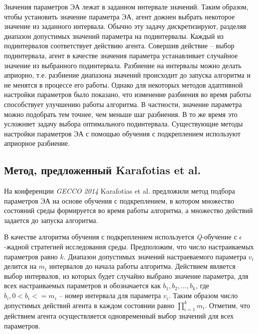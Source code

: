 Значения параметров ЭА лежат в заданном интервале значений. Таким образом, чтобы установить значение параметра ЭА, агент дожнен выбрать некоторое значение из заданного интервала. Обычно эту задачу дискретизируют, разделяя диапазон допустимых значений параметра на подинтервалы. Каждый из подинтервалов соответствует действию агента. Совершив действие -- выбор подинтервала, агент в качестве значения параметра устанавливает случайное значение из выбранного подинтервала. Разбиение на интервалы можно делать априорно, т.е. разбиение диапазона значений происходит до запуска алгоритма и не менятся в процессе его работы. Однако для некоторых методов адаптивной настройки параметров было показано, что изменение разбиения во время работы способствует улучшению работы алгоритма. В частности, значение параметра можно подобрать тем точнее, чем меньше шаг разбиения. В то же время это усложняет задачу выбора оптимального подинтервала. Существующие методы настройки параметров ЭА с помощью обучения с подкреплением используют априорное разбиение.

\subsection{Метод, предложенный Karafotias et al.}
\label{karafotias}

На конференции \textit{GECCO 2014} Karafotias et al. предложили метод подбора параметров ЭА на основе обучения с подкреплением, в котором множество состояний среды формируется во время работы алгоритма, а множество действий задается до запуска алгоритма.

В качестве алгоритма обучения с подкреплением используется \textit{Q}-обучение с $\epsilon$-жадной стратегией исследования среды.
Предположим, что число настраиваемых параметров равно $k$. Диапазон допустимых значений настраеваемого параметра $v_i$ делится на $m_i$ интервалов до начала работы алгоритма. Действием является выбор интервалов, из которых будет случайно выбрано значение параметра, для всех настраиваемых параметров и обозначается как $b_1, b_2, \ldots, b_k$, где $b_i, 0 < b_i <= m_i$ -- номер интервала для параметра $v_i$. Таким образом число допустимых действий агента в каждом состоянии равно $\prod\limits_{i = 1}^k{m_i}$. Отметим, что действием агента осуществляется одновременный выбор значений для всех параметров. 

